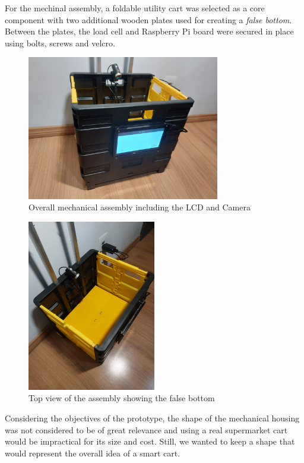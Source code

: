 \documentclass[openright]{normas-utf-tex} %
\begin{document}
For the mechinal assembly, a foldable utility cart was selected as a core
component with two additional wooden plates used for creating a \textit{false
bottom}. Between the plates, the load cell and Raspberry Pi board were secured
in place using bolts, screws and velcro.

\begin{figure}[H]
	\centering
	\includegraphics[width=0.75\textwidth]{./images/cart.jpeg}
	\caption[Overall mechanical assembly including the LCD and Camera]{Overall mechanical assembly including the LCD and Camera}
\end{figure}

\begin{figure}[H]
	\centering
	\includegraphics[width=0.5\textwidth]{./images/carttop.jpeg}
	\caption[Top view of the assembly showing the false bottom]{Top view of the assembly showing the false bottom}
\end{figure}

Considering the objectives of the prototype, the shape of the mechanical
housing was not considered to be of great relevance and using a real
supermarket cart would be impractical for its size and cost. Still, we wanted
to keep a shape that would represent the overall idea of a smart cart.
\end{document}
